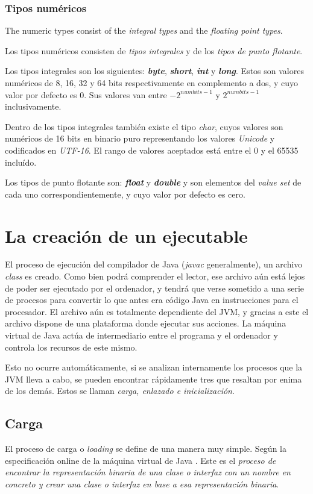 \documentclass[english,runningheads,a4paper]{llncs}[2018/03/10]
\begin{document}
\subsubsection*{Tipos numéricos}
The numeric types consist of the \textit{integral types} and the
\textit{floating point types}.

Los tipos numéricos consisten de \textit{tipos integrales} y de los
\textit{tipos de punto flotante}.

Los tipos integrales son los siguientes: \textit{\textbf{byte}},
\textit{\textbf{short}}, \textit{\textbf{int}} y
\textit{\textbf{long}}. Estos son valores numéricos de 8, 16, 32 y 64 bits
respectivamente en complemento a dos, y cuyo valor por defecto es
0. Sus valores van entre \(-2^{num bits-1}\) y \(2^{num bits-1}\)
inclusivamente. \parencite{jvmspec}

Dentro de los tipos integrales también existe el tipo \textit{char}, cuyos
valores son numéricos de 16 bits en binario puro representando los valores
\textit{Unicode} y codificados en \textit{UTF-16}. El rango de valores aceptados
está entre el 0 y el 65535 incluído.

Los tipos de punto flotante son: \textbf{\textit{float}} y
\textbf{\textit{double}} y son elementos del \textit{value set} de cada uno
correspondientemente, y cuyo valor por defecto es cero.

\section*{La creación de un ejecutable}
El proceso de ejecución del compilador de Java (\textit{javac} generalmente), un
archivo \textit{class} es creado. Como bien podrá comprender el lector, ese
archivo aún está lejos de poder ser ejecutado por el ordenador, y tendrá que
verse sometido a una serie de procesos para convertir lo que antes era código
Java en instrucciones para el procesador. El archivo aún es totalmente
dependiente del JVM, y gracias a este el archivo dispone de una plataforma donde
ejecutar sus acciones. La máquina virtual de Java actúa de intermediario entre
el programa y el ordenador y controla los recursos de este mismo.

Esto no ocurre automáticamente, si se analizan internamente los procesos que la
JVM lleva a cabo, se pueden encontrar rápidamente tres que resaltan por enima de
los demás. Estos se llaman \textit{carga, enlazado e inicialización}.

\subsection*{Carga}
El proceso de carga o \textit{loading} se define de una manera muy simple. Según
la especificación online de la máquina virtual de Java \parencite{jvmspec}. Este
es el \textit{proceso de encontrar la representación binaria de una clase o
interfaz con un nombre en concreto y crear una clase o interfaz en base a esa
representación binaria}.
\end{document}
